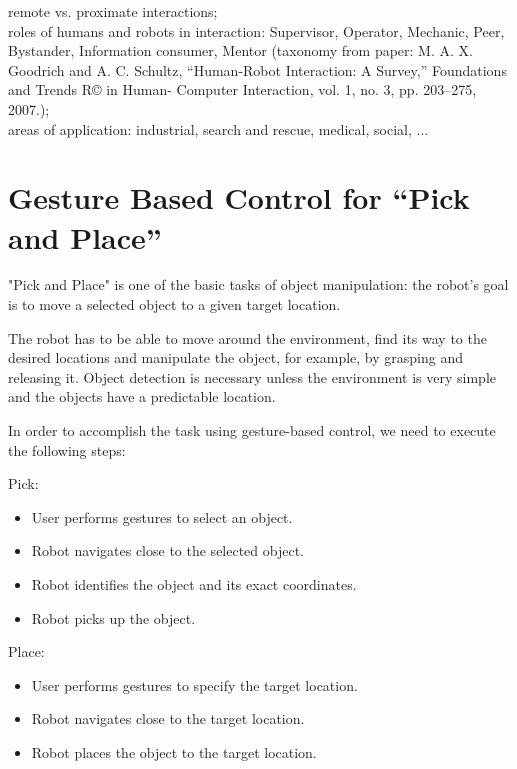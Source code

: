 remote vs. proximate interactions; \\

roles of humans and robots in interaction: Supervisor, Operator, Mechanic, Peer, Bystander, Information consumer, Mentor (taxonomy from paper: M. A. X. Goodrich and A. C. Schultz, “Human-Robot Interaction: A Survey,” Foundations and Trends R© in Human- Computer Interaction, vol. 1, no. 3, pp. 203–275, 2007.); \\

areas of application: industrial, search and rescue, medical, social, ...\\

\section{Gesture Based Control for “Pick and Place”}
"Pick and Place" is one of the basic tasks of object manipulation: the robot's goal is to move a selected object to a given target location.\par
The robot has to be able to move around the environment, find its way to the desired locations and manipulate the object, for example, by grasping and releasing it. Object detection is necessary unless the environment is very simple and the objects have a predictable location.\par
In order to accomplish the task using gesture-based control, we need to execute the following steps:\par

Pick:\\
\begin{itemize}
\item {User performs gestures to select an object.}
\item {Robot navigates close to the selected object.}
\item {Robot identifies the object and its exact coordinates.}
\item {Robot picks up the object.}
\end{itemize}


Place:\\
\begin{itemize}
\item {User performs gestures to specify the target location.}
\item {Robot navigates close to the target location.}
\item {Robot places the object to the target location.}
\end{itemize}


